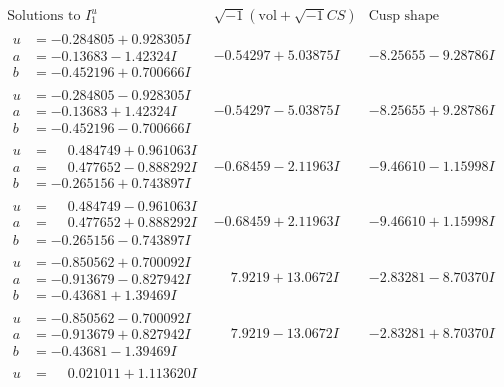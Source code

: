 \documentclass[1p]{elsarticle_modified}
\theoremstyle{definition}
\newcommand{\I}{\sqrt{-1}}
\begin{document}
$$\begin{array}{c|c|c}  
\text{Solutions to }I^u_{1}& \I (\text{vol} + \sqrt{-1}CS) & \text{Cusp shape}\\
 \hline 
\begin{aligned}
u &= -0.284805 + 0.928305 I \\
a &= -0.13683 - 1.42324 I \\
b &= -0.452196 + 0.700666 I\end{aligned}
 & -0.54297 + 5.03875 I & -8.25655 - 9.28786 I \\ \hline\begin{aligned}
u &= -0.284805 - 0.928305 I \\
a &= -0.13683 + 1.42324 I \\
b &= -0.452196 - 0.700666 I\end{aligned}
 & -0.54297 - 5.03875 I & -8.25655 + 9.28786 I \\ \hline\begin{aligned}
u &= \phantom{-}0.484749 + 0.961063 I \\
a &= \phantom{-}0.477652 - 0.888292 I \\
b &= -0.265156 + 0.743897 I\end{aligned}
 & -0.68459 - 2.11963 I & -9.46610 - 1.15998 I \\ \hline\begin{aligned}
u &= \phantom{-}0.484749 - 0.961063 I \\
a &= \phantom{-}0.477652 + 0.888292 I \\
b &= -0.265156 - 0.743897 I\end{aligned}
 & -0.68459 + 2.11963 I & -9.46610 + 1.15998 I \\ \hline\begin{aligned}
u &= -0.850562 + 0.700092 I \\
a &= -0.913679 - 0.827942 I \\
b &= -0.43681 + 1.39469 I\end{aligned}
 & \phantom{-}7.9219 + 13.0672 I & -2.83281 - 8.70370 I \\ \hline\begin{aligned}
u &= -0.850562 - 0.700092 I \\
a &= -0.913679 + 0.827942 I \\
b &= -0.43681 - 1.39469 I\end{aligned}
 & \phantom{-}7.9219 - 13.0672 I & -2.83281 + 8.70370 I \\ \hline\begin{aligned}
u &= \phantom{-}0.021011 + 1.113620 I \\

\end{aligned}
\end{array}$$
\end{document}
